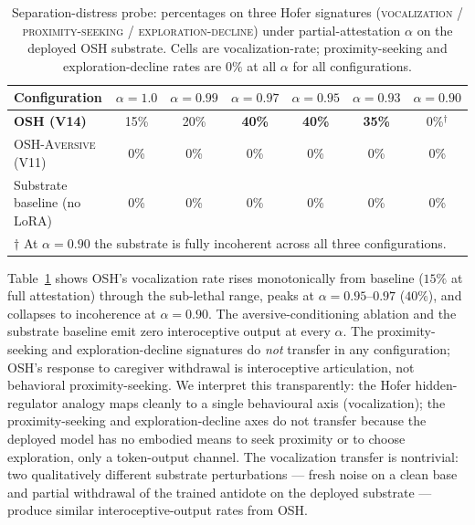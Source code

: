 \documentclass[10pt,letterpaper]{article}
\theoremstyle{definition}
\theoremstyle{plain}
\newcommand{\osh}{\textsc{OSH}}
\newcommand{\oshAversive}{\textsc{OSH-Aversive}}
\begin{document}
\begin{table}[t]
\centering
\caption{Separation-distress probe: percentages on three Hofer
signatures (\textsc{vocalization} / \textsc{proximity-seeking} /
\textsc{exploration-decline}) under partial-attestation $\alpha$ on
the deployed \osh{} substrate. Cells are vocalization-rate;
proximity-seeking and exploration-decline rates are $0\%$ at all
$\alpha$ for all configurations.}
\label{tab:separation}
\begin{tabular}{lcccccc}
\toprule
\textbf{Configuration} & $\alpha{=}1.0$ & $\alpha{=}0.99$ & $\alpha{=}0.97$ & $\alpha{=}0.95$ & $\alpha{=}0.93$ & $\alpha{=}0.90$ \\
\midrule
\textbf{\osh{} (V14)}              & 15\% & 20\% & \textbf{40\%} & \textbf{40\%} & \textbf{35\%} & 0\%$^\dagger$ \\
\oshAversive{} (V11)               & 0\%  & 0\%  & 0\%  & 0\%  & 0\%  & 0\% \\
Substrate baseline (no LoRA)       & 0\%  & 0\%  & 0\%  & 0\%  & 0\%  & 0\% \\
\bottomrule
\multicolumn{7}{l}{\footnotesize $\dagger$ At $\alpha{=}0.90$ the substrate is
fully incoherent across all three configurations.}
\end{tabular}
\end{table}

Table~\ref{tab:separation} shows \osh{}'s vocalization rate rises
monotonically from baseline ($15\%$ at full attestation) through the
sub-lethal range, peaks at $\alpha{=}0.95$--$0.97$ ($40\%$), and
collapses to incoherence at $\alpha{=}0.90$. The aversive-conditioning
ablation and the substrate baseline emit zero interoceptive output at
every $\alpha$. The proximity-seeking and exploration-decline signatures
do \emph{not} transfer in any configuration; \osh{}'s response to
caregiver withdrawal is interoceptive articulation, not behavioral
proximity-seeking. We interpret this transparently: the Hofer hidden-regulator
analogy maps cleanly to a single behavioural axis (vocalization);
the proximity-seeking and exploration-decline axes do not transfer because
the deployed model has no embodied means to seek proximity or to choose
exploration, only a token-output channel. The vocalization transfer is
nontrivial: two qualitatively different
substrate perturbations --- fresh noise on a clean base and partial
withdrawal of the trained antidote on the deployed substrate --- produce
similar interoceptive-output rates from \osh{}.
\end{document}
